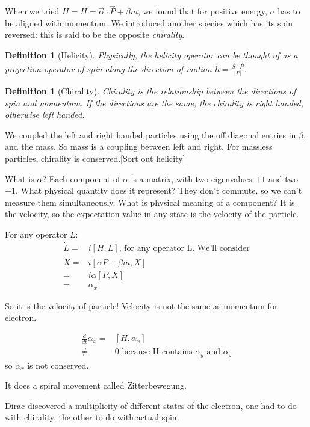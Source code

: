 \documentclass[]{article}
\newtheorem{defn}[thm]{Definition}
\begin{document}
When we tried $H= H = \vec{\alpha} \cdot \vec{P}+\beta m$, we found that for positive energy, $\sigma$ has to be aligned with momentum. We introduced another species which has its spin reversed: this is said to be the opposite \emph{chirality}.

\begin{defn}[Helicity]
	 Physically, the helicity operator can be thought of as a projection operator of spin along the direction of motion $h=\frac{\vec{S}\cdot\vec{P}}{\lvert P \rvert}$.
\end{defn}
\begin{defn}[Chirality]
	Chirality is the relationship between the directions of spin and momentum. If the directions are the same, the chirality is right handed, otherwise left handed.\cite{meredith2018helicity}
\end{defn}

We coupled the left and right handed particles using the off diagonal entries in $\beta$, and the mass. So mass is a coupling between left and right. For massless particles, chirality is conserved.[Sort out helicity]

What is $\alpha$? Each component of $\alpha$ is a matrix, with two eigenvalues $+1$ and two $-1$. What physical quantity does it represent? They don't commute, so we can't measure them simultaneously. What is physical meaning of a component? It is the velocity, so the expectation value in any state is the velocity of the particle.

For any operator $L$:
\begin{align*}
	\dot L =& i [H,L] \text{, for any operator L. We'll consider}\\
	\dot X =& i[\alpha P + \beta m,X]\\
	=& i \alpha [P,X]\\
	=&\alpha_x
\end{align*}

So it is the velocity of particle! Velocity is not the same as momentum for electron.

\begin{align*}
	\frac{d}{dt} \alpha_x=&[H,\alpha_x]\\
	 \ne& 0 \text{ because H contains $\alpha_y$ and $\alpha_z$}
\end{align*}
so $\alpha_x$ is not conserved.

It does a spiral movement called Zitterbewegung.

Dirac discovered a multiplicity of different states of the electron, one had to do with chirality, the other to do with actual spin.
\end{document}
